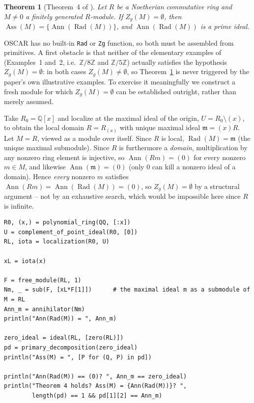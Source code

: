 \documentclass[11pt]{article}
\newtheorem{theorem}{Theorem}
\newcommand{\Ann}{\operatorname{Ann}}
\newcommand{\Rad}{\operatorname{Rad}}
\newcommand{\Ass}{\operatorname{Ass}}
\begin{document}
\begin{theorem}[Theorem~4 of \cite{pekin-ozkaya-2026}]
\label{thm:4}
Let $R$ be a Noetherian commutative ring and $M\neq 0$ a finitely
generated $R$-module. If $Z_g(M)=\emptyset$, then
$\Ass(M)=\{\Ann(\Rad(M))\}$, and $\Ann(\Rad(M))$ is a prime ideal.
\end{theorem}

OSCAR has no built-in \texttt{Rad} or \texttt{Zg} function, so both must
be assembled from primitives. A first obstacle is that neither of the
elementary examples of \cite{pekin-ozkaya-2026} (Examples~1 and~2,
i.e.\ $\mathbb Z/8\mathbb Z$ and $\mathbb Z/5\mathbb Z$) actually
satisfies the hypothesis $Z_g(M)=\emptyset$: in both cases $Z_g(M)\neq
\emptyset$, so Theorem~\ref{thm:4} is never triggered by the paper's own
illustrative examples. To exercise it meaningfully we construct a fresh
module for which $Z_g(M)=\emptyset$ can be established outright, rather
than merely assumed.

Take $R_0=\mathbb Q[x]$ and localize at the maximal ideal of the origin,
$U=R_0\setminus (x)$, to obtain the local domain $R=R_{(x)}$ with unique
maximal ideal $\mathfrak m=(x)R$. Let $M=R$, viewed as a module over
itself. Since $R$ is local, $\Rad(M)=\mathfrak m$ (the unique maximal
submodule). Since $R$ is furthermore a \emph{domain}, multiplication by
any nonzero ring element is injective, so $\Ann(Rm)=(0)$ for every
nonzero $m\in M$, and likewise $\Ann(\mathfrak m)=(0)$ (only $0$ can kill
a nonzero ideal of a domain). Hence \emph{every} nonzero $m$ satisfies
$\Ann(Rm)=\Ann(\Rad(M))=(0)$, so $Z_g(M)=\emptyset$ by a structural
argument -- not by an exhaustive search, which would be impossible here
since $R$ is infinite.

\begin{lstlisting}
R0, (x,) = polynomial_ring(QQ, [:x])
U = complement_of_point_ideal(R0, [0])
RL, iota = localization(R0, U)

xL = iota(x)

F = free_module(RL, 1)
Nm, _ = sub(F, [xL*F[1]])      # the maximal ideal m as a submodule of M = RL
Ann_m = annihilator(Nm)
println("Ann(Rad(M)) = ", Ann_m)

zero_ideal = ideal(RL, [zero(RL)])
pd = primary_decomposition(zero_ideal)
println("Ass(M) = ", [P for (Q, P) in pd])

println("Ann(Rad(M)) == (0)? ", Ann_m == zero_ideal)
println("Theorem 4 holds? Ass(M) = {Ann(Rad(M))}? ",
        length(pd) == 1 && pd[1][2] == Ann_m)
\end{lstlisting}
\end{document}
